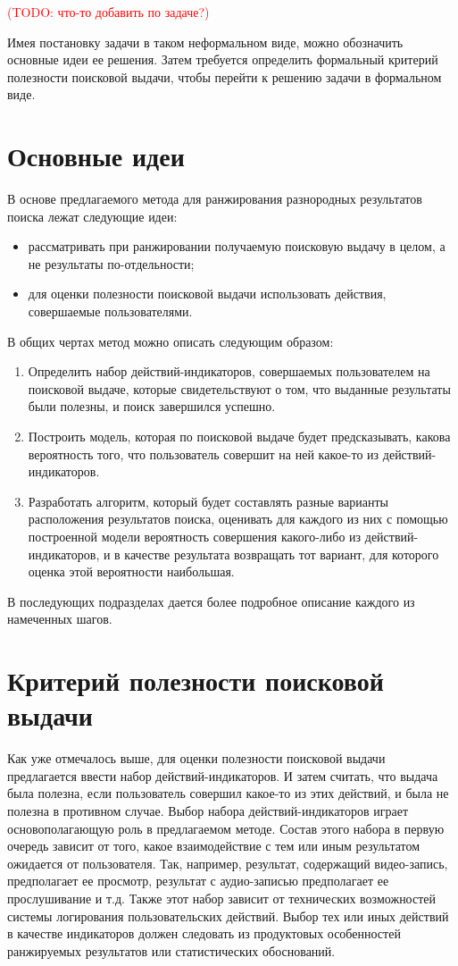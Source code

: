 \documentclass[12pt,a4paper]{report}
\newcommand\note[1]{\textcolor{red}{(#1)}}
\newcommand\todonote[1]{\note{TODO: #1}}
\begin{document}
\todonote{что-то добавить по задаче?}

Имея постановку задачи в таком неформальном виде, можно обозначить основные идеи ее решения. Затем требуется определить формальный критерий полезности поисковой выдачи, чтобы перейти к решению задачи в формальном виде.

\section{Основные идеи}

В основе предлагаемого метода для ранжирования разнородных результатов поиска лежат следующие идеи:
\begin{itemize}
\item рассматривать при ранжировании получаемую поисковую выдачу в целом, а не результаты по-отдельности;
\item для оценки полезности поисковой выдачи использовать действия, совершаемые пользователями.
\end{itemize}
В общих чертах метод можно описать следующим образом:
\begin{enumerate}
\item Определить набор действий-индикаторов, совершаемых пользователем на поисковой выдаче, которые свидетельствуют о том, что выданные результаты были полезны, и поиск завершился успешно.
\item Построить модель, которая по поисковой выдаче будет предсказывать, какова вероятность того, что пользователь совершит на ней какое-то из действий-индикаторов.
\item Разработать алгоритм, который будет составлять разные варианты расположения результатов поиска, оценивать для каждого из них с помощью построенной модели вероятность совершения какого-либо из действий-индикаторов, и в качестве результата возвращать тот вариант, для которого оценка этой вероятности наибольшая.
\end{enumerate}
В последующих подразделах дается более подробное описание каждого из намеченных шагов. 

\section{Критерий полезности поисковой выдачи}

Как уже отмечалось выше, для оценки полезности поисковой выдачи предлагается ввести набор действий-индикаторов. И затем считать, что выдача была полезна, если пользователь совершил какое-то из этих действий, и была не полезна в противном случае. Выбор набора действий-индикаторов играет основополагающую роль в предлагаемом методе. Состав этого набора в первую очередь зависит от того, какое взаимодействие с тем или иным результатом ожидается от пользователя. Так, например, результат, содержащий видео-запись, предполагает ее просмотр, результат с аудио-записью предполагает ее прослушивание и т.д. Также этот набор зависит от технических возможностей системы логирования пользовательских действий. Выбор тех или иных действий в качестве индикаторов должен следовать из продуктовых особенностей ранжируемых результатов или статистических обоснований.
\end{document}
